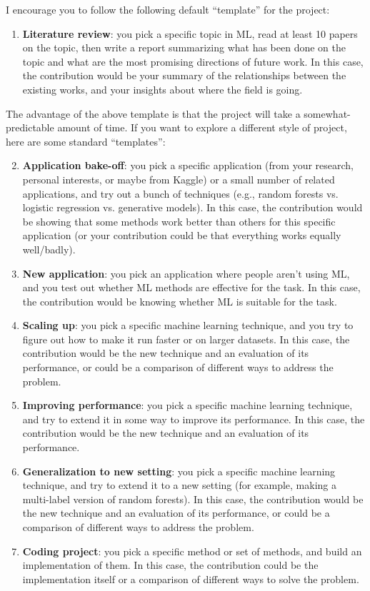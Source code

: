\documentclass{article}
\def\enum#1{\begin{enumerate}#1\end{enumerate}}
\begin{document}
I encourage you to follow the following default ``template'' for the project:
\enum{
\item \textbf{Literature review}: you pick a specific topic in ML, read at least 10 papers on the topic, then write a report summarizing what has been done on the topic and what are the most promising directions of future work. In this case, the contribution would be your summary of the relationships between the existing works, and your insights about where the field is going.
}
The advantage of the above template is that the project will take a somewhat-predictable amount of time. If you want to explore a different style of project, here are some standard ``templates'':
\enum{
\setcounter{enumi}{1}
\item \textbf{Application bake-off}: you pick a specific application (from your research, personal interests, or maybe from Kaggle) or a small number of related applications, and try out a bunch of techniques (e.g., random forests vs. logistic regression vs. generative models). In this case, the contribution would be showing that some methods work better than others for this specific application (or your contribution could be that everything works equally well/badly).
\item \textbf{New application}: you pick an application where people aren't using ML, and you test out whether ML methods are effective for the task. In this case, the contribution would be knowing whether ML is suitable for the task.
\item \textbf{Scaling up}: you pick a specific machine learning technique, and you try to figure out how to make it run faster or on larger datasets. In this case, the contribution would be the new technique and an evaluation of its performance, or could be a comparison of different ways to address the problem.
\item \textbf{Improving performance}: you pick a specific machine learning technique, and try to extend it in some way to improve its performance. In this case, the contribution would be the new technique and an evaluation of its performance.
\item \textbf{Generalization to new setting}: you pick a specific machine learning technique, and try to extend it to a new setting (for example, making a multi-label version of random forests).  In this case, the contribution would be the new technique and an evaluation of its performance, or could be a comparison of different ways to address the problem.
\item \textbf{Coding project}: you pick a specific method or set of methods, and build an implementation of them. In this case, the contribution could be the implementation itself or a comparison of different ways to solve the problem.
}
\end{document}
